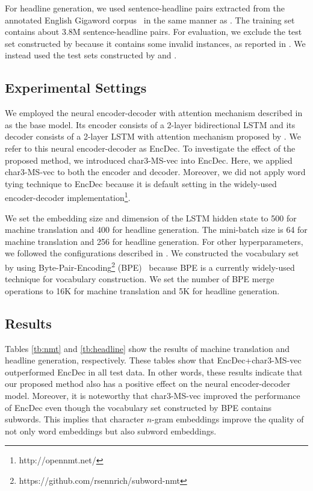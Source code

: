 \documentclass[letterpaper]{article} %
\begin{document}
For headline generation, we used sentence-headline pairs extracted from the annotated English Gigaword corpus~\cite{Napoles:2012:AG:2391200.2391218} in the same manner as \cite{rush-chopra-weston:2015:EMNLP}.
The training set contains about 3.8M sentence-headline pairs.
For evaluation, we exclude the test set constructed by \cite{rush-chopra-weston:2015:EMNLP} because it contains some invalid instances, as reported in \cite{zhou-EtAl:2017:Long}.
We instead used the test sets constructed by \cite{zhou-EtAl:2017:Long} and \cite{kiyono}.




\subsection{Experimental Settings}
We employed the neural encoder-decoder with attention mechanism described in \cite{kiyono} as the base model.
Its encoder consists of a 2-layer bidirectional LSTM and its decoder consists of a 2-layer LSTM with attention mechanism proposed by \cite{luong-pham-manning:2015:EMNLP}.
We refer to this neural encoder-decoder as EncDec.
To investigate the effect of the proposed method, we introduced char3-MS-vec into EncDec.
Here, we applied char3-MS-vec to both the encoder and decoder.
Moreover, we did not apply word tying technique to EncDec because it is default setting in the widely-used encoder-decoder implementation\footnote{http://opennmt.net/}.


We set the embedding size and dimension of the LSTM hidden state to 500 for machine translation and 400 for headline generation.
The mini-batch size is 64 for machine translation and 256 for headline generation.
For other hyperparameters, we followed the configurations described in \cite{kiyono}.
We constructed the vocabulary set by using Byte-Pair-Encoding\footnote{https://github.com/rsennrich/subword-nmt} (BPE)~\cite{sennrich-haddow-birch:2016:P16-11} because BPE is a currently widely-used technique for vocabulary construction.
We set the number of BPE merge operations to 16K for machine translation and 5K for headline generation.


\subsection{Results}

Tables \ref{tb:nmt} and \ref{tb:headline} show the results of machine translation and headline generation, respectively.
These tables show that EncDec+char3-MS-vec outperformed EncDec in all test data.
In other words, these results indicate that our proposed method also has a positive effect on the neural encoder-decoder model.
Moreover, it is noteworthy that char3-MS-vec improved the performance of EncDec even though the vocabulary set constructed by BPE contains subwords.
This implies that character $n$-gram embeddings improve the quality of not only word embeddings but also subword embeddings.
\end{document}
